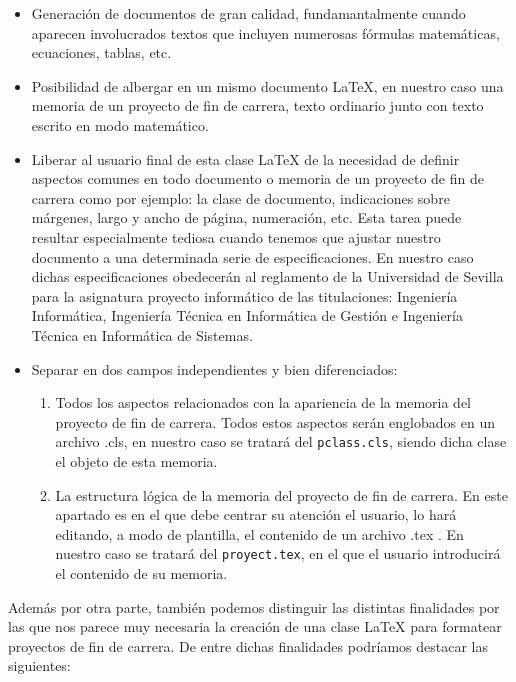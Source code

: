 			\begin{itemize}
					\item Generaci\'on de documentos de gran calidad, fundamantalmente cuando aparecen involucrados textos
								que incluyen numerosas f\'ormulas matem\'aticas, ecuaciones, tablas, etc.
					\item Posibilidad de albergar en un mismo documento \LaTeX{}, en nuestro caso una memoria de un proyecto de fin
								de carrera, texto ordinario junto con texto escrito en modo matem\'atico.
					\item Liberar al usuario final de esta clase \LaTeX{} de la necesidad de definir aspectos comunes en todo documento 
								o memoria de un proyecto de fin de carrera como por ejemplo: la clase de documento, indicaciones sobre
								m\'argenes, largo y ancho de p\'agina, numeraci\'on, etc. Esta tarea puede resultar especialmente tediosa
								cuando tenemos que ajustar nuestro documento a una determinada serie de especificaciones. En nuestro caso 
								dichas especificaciones obedecer\'an al reglamento de la Universidad de Sevilla para la asignatura 
								proyecto inform\'atico de las titulaciones: Ingenier\'ia Inform\'atica, Ingenier\'ia T\'ecnica 
								en Inform\'atica de Gesti\'on e Ingenier\'ia T\'ecnica en Inform\'atica de Sistemas.
					\item Separar en dos campos independientes y bien diferenciados: 
										
								\begin{enumerate}
											\item Todos los aspectos relacionados con la apariencia de la memoria del proyecto de 
														fin de carrera. Todos estos aspectos ser\'an englobados en un archivo .cls, en nuestro caso 
														se tratar\'a del \texttt{pclass.cls}, siendo dicha clase el objeto de esta memoria.
											\item La estructura l\'ogica de la memoria del proyecto de fin de carrera. En este apartado es
														en el que debe centrar su atenci\'on el usuario, lo har\'a editando, a modo de plantilla, 
														el contenido de un archivo .tex . En nuestro caso se tratar\'a del \texttt{proyect.tex}, 
														en el que el usuario introducir\'a el contenido de su memoria.
								\end{enumerate}
								
			\end{itemize}
	
	Adem\'as por otra parte, tambi\'en podemos distinguir las distintas finalidades por las que nos parece muy necesaria 
	la creaci\'on de una clase \LaTeX{} para formatear proyectos de fin de carrera. De entre dichas finalidades podr\'iamos 
	destacar las siguientes:
	
